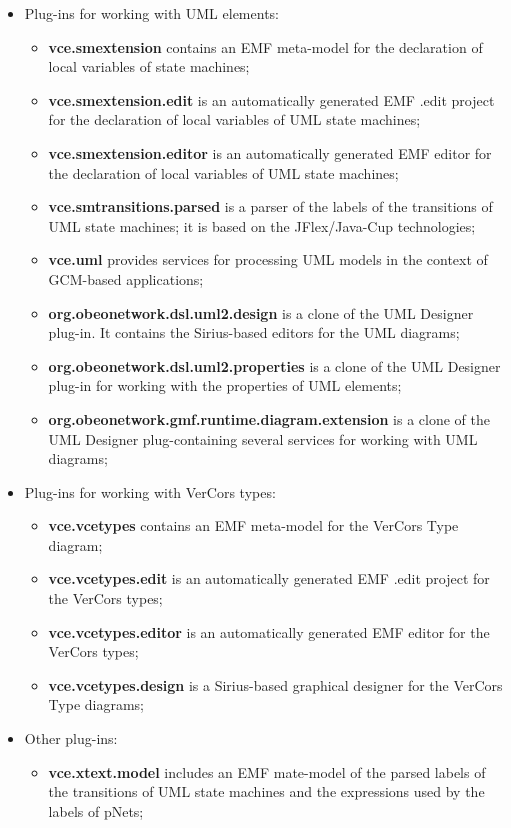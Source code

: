 \documentclass[12pt]{article}
\begin{document}
\begin{itemize}
\item
Plug-ins for working with UML elements:
\begin{itemize}
\item
\textbf{vce.smextension} contains an EMF meta-model for the declaration of local variables of state machines;
\item
\textbf{vce.smextension.edit} is an automatically generated EMF .edit project for the declaration of local variables of UML state machines;
\item
\textbf{vce.smextension.editor} is an automatically generated EMF editor for the declaration of local variables of UML state machines;
\item
\textbf{vce.smtransitions.parsed} is a parser of the labels of the transitions of UML state machines; it is based on the JFlex/Java-Cup technologies;
\item
\textbf{vce.uml} provides services for processing UML models in the context of GCM-based applications;
\item
\textbf{org.obeonetwork.dsl.uml2.design} is a clone of the UML Designer plug-in. It contains the Sirius-based editors for the UML diagrams;
\item
\textbf{org.obeonetwork.dsl.uml2.properties} is a clone of the UML Designer plug-in for working with the properties of UML elements;
\item
\textbf{org.obeonetwork.gmf.runtime.diagram.extension} is a clone of the UML Designer plug-containing several services for working with UML diagrams;
\end{itemize}

\item
Plug-ins for working with VerCors types:
\begin{itemize}
\item
\textbf{vce.vcetypes} contains an EMF meta-model for the VerCors Type diagram;
\item
\textbf{vce.vcetypes.edit} is an automatically generated EMF .edit project for the VerCors types;
\item
\textbf{vce.vcetypes.editor} is an automatically generated EMF editor for the VerCors types;
\item
\textbf{vce.vcetypes.design} is a Sirius-based graphical designer for the VerCors Type diagrams;
\end{itemize}

\item
Other plug-ins:
\begin{itemize}
\item
\textbf{vce.xtext.model} includes an EMF mate-model of the parsed labels of the transitions of UML state machines and the expressions used by the labels of pNets;
\end{itemize}


\end{itemize}
\end{document}

